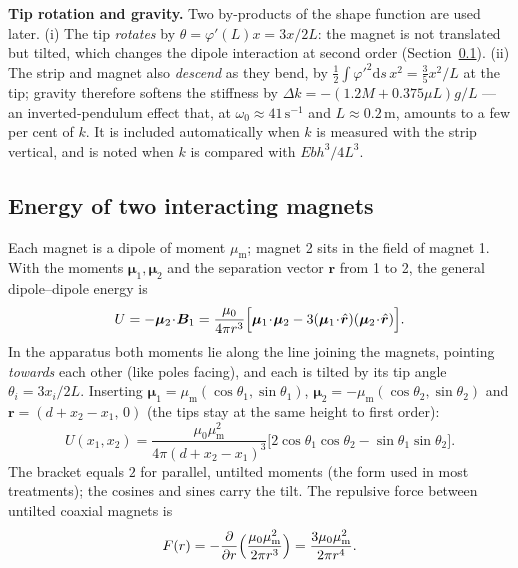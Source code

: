 \documentclass[11pt,a4paper]{article}
\newcommand{\muz}{\mu_0}
\newcommand{\mum}{\mu_{\mathrm m}}
\newcommand{\dd}{\mathrm{d}}
\newcommand{\un}[1]{\,\mathrm{#1}}
\begin{document}
\begin{notebox}
\textbf{Tip rotation and gravity.} Two by-products of the shape function are used later. (i) The tip \emph{rotates} by $\theta=\varphi'(L)x=3x/2L$: the magnet is not translated but tilted, which changes the dipole interaction at second order (Section~\ref{sec:magnet}). (ii) The strip and magnet also \emph{descend} as they bend, by $\tfrac12\int\varphi'^2\dd s\,x^2=\tfrac35x^2/L$ at the tip; gravity therefore softens the stiffness by $\Delta k=-(1.2M+0.375\mu L)g/L$ --- an inverted-pendulum effect that, at $\omega_0\approx41\un{s^{-1}}$ and $L\approx0.2\un{m}$, amounts to a few per cent of $k$. It is included automatically when $k$ is measured with the strip vertical, and is noted when $k$ is compared with $Ebh^3/4L^3$.
\end{notebox}

\subsection{Energy of two interacting magnets}\label{sec:magnet}

Each magnet is a dipole of moment $\mum$; magnet 2 sits in the field of magnet 1. With the moments $\bm\mu_1,\bm\mu_2$ and the separation vector $\bm r$ from 1 to 2, the general dipole--dipole energy is \cite{griffiths}
\begin{equation}
U=-\bm\mu_2\!\cdot\!\bm B_1=\frac{\muz}{4\pi r^3}\Bigl[\bm\mu_1\!\cdot\!\bm\mu_2-3(\bm\mu_1\!\cdot\!\hat{\bm r})(\bm\mu_2\!\cdot\!\hat{\bm r})\Bigr].
\label{eq:Ugen}
\end{equation}
In the apparatus both moments lie along the line joining the magnets, pointing \emph{towards} each other (like poles facing), and each is tilted by its tip angle $\theta_i=3x_i/2L$. Inserting $\bm\mu_1=\mum(\cos\theta_1,\sin\theta_1)$, $\bm\mu_2=-\mum(\cos\theta_2,\sin\theta_2)$ and $\bm r=(d+x_2-x_1,\,0)$ (the tips stay at the same height to first order):
\begin{equation}
U(x_1,x_2)=\frac{\muz\mum^2}{4\pi (d+x_2-x_1)^3}\bigl[2\cos\theta_1\cos\theta_2-\sin\theta_1\sin\theta_2\bigr].
\label{eq:Utilt}
\end{equation}
The bracket equals $2$ for parallel, untilted moments (the form used in most treatments); the cosines and sines carry the tilt. The repulsive force between untilted coaxial magnets is
\begin{equation}
F(r)=-\frac{\partial}{\partial r}\Bigl(\frac{\muz\mum^2}{2\pi r^3}\Bigr)=\frac{3\muz\mum^2}{2\pi r^4}.
\label{eq:F}
\end{equation}
\end{document}
